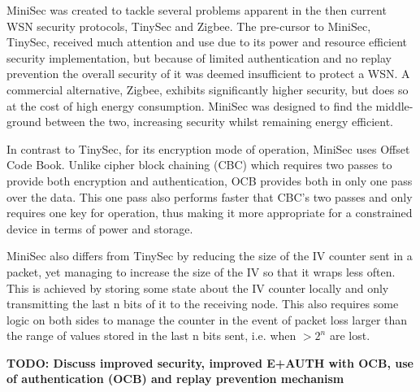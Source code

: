 MiniSec was created to tackle several problems apparent in the then current WSN security protocols, TinySec and Zigbee. The pre-cursor to MiniSec, TinySec, received much attention and use due to its power and resource efficient security implementation, but because of limited authentication and no replay prevention the overall security of it was deemed insufficient to protect a WSN. A commercial alternative, Zigbee, exhibits significantly higher security, but does so at the cost of high energy consumption. MiniSec was designed to find the middle-ground between the two, increasing security whilst remaining energy efficient. 


In contrast to TinySec, for its encryption mode of operation, MiniSec uses Offset Code Book. Unlike cipher block chaining (CBC) which requires two passes to provide both encryption and authentication, OCB provides both in only one pass over the data. This one pass also performs faster that CBC's two passes and only requires one key for operation, thus making it more appropriate for a constrained device in terms of power and storage. 

MiniSec also differs from TinySec by reducing the size of the IV counter sent in a packet, yet managing to increase the size of the IV so that it wraps less often. This is achieved by storing some state about the IV counter locally and only transmitting the last n bits of it to the receiving node. This also requires some logic on both sides to manage the counter in the event of packet loss larger than the range of values stored in the last n bits sent, i.e. when $>2^n$ are lost.

\textbf{TODO: Discuss improved security, improved E+AUTH with OCB, use of authentication (OCB) and replay prevention mechanism}